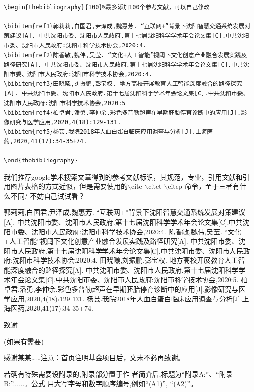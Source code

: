 \documentclass[a4paper, 10pt]{AvicReport}
\begin{document}
\begin{lstlisting}

\begin{thebibliography}{100}%最多添加100个参考文献，可以自己修改

\bibitem{ref1}郭莉莉,白国君,尹泽成,魏惠芳. “互联网+”背景下沈阳智慧交通系统发展对策建议[A]. 中共沈阳市委、沈阳市人民政府.第十七届沈阳科学学术年会论文集[C].中共沈阳市委、沈阳市人民政府:沈阳市科学技术协会,2020:4.
\bibitem{ref2}陈香敏,魏伟,吴莹. “文化+人工智能”视阈下文化创意产业融合发展实践及路径研究[A]. 中共沈阳市委、沈阳市人民政府.第十七届沈阳科学学术年会论文集[C].中共沈阳市委、沈阳市人民政府:沈阳市科学技术协会,2020:4.
\bibitem{ref3}田晓曦,刘振鹏,彭宝权. 地方高校开展教育人工智能深度融合的路径探究[A]. 中共沈阳市委、沈阳市人民政府.第十七届沈阳科学学术年会论文集[C].中共沈阳市委、沈阳市人民政府:沈阳市科学技术协会,2020:5.
\bibitem{ref4}柏卓君,潘勇,李仲余.彩色多普勒超声在早期胚胎停育诊断中的应用[J].影像研究与医学应用,2020,4(18):129-131.
\bibitem{ref5}杨芸.我院2018年人血白蛋白临床应用调查与分析[J].上海医药,2020,41(17):34-35+74.

\end{thebibliography}

\end{lstlisting}

我们推荐google学术搜索文章得到的参考文献标识，其规范，专业。引用文献和引用图片表格的方式近似，但是需要使用的$\backslash$cite $\backslash$citet $\backslash$citep 命令，至于三者有什么不同? 不妨自己试试看？




\begin{thebibliography}{100}

郭莉莉,白国君,尹泽成,魏惠芳. “互联网+”背景下沈阳智慧交通系统发展对策建议[A]. 中共沈阳市委、沈阳市人民政府.第十七届沈阳科学学术年会论文集[C].中共沈阳市委、沈阳市人民政府:沈阳市科学技术协会,2020:4.
陈香敏,魏伟,吴莹. “文化+人工智能”视阈下文化创意产业融合发展实践及路径研究[A]. 中共沈阳市委、沈阳市人民政府.第十七届沈阳科学学术年会论文集[C].中共沈阳市委、沈阳市人民政府:沈阳市科学技术协会,2020:4.
田晓曦,刘振鹏,彭宝权. 地方高校开展教育人工智能深度融合的路径探究[A]. 中共沈阳市委、沈阳市人民政府.第十七届沈阳科学学术年会论文集[C].中共沈阳市委、沈阳市人民政府:沈阳市科学技术协会,2020:5.
柏卓君,潘勇,李仲余.彩色多普勒超声在早期胚胎停育诊断中的应用[J].影像研究与医学应用,2020,4(18):129-131.
杨芸.我院2018年人血白蛋白临床应用调查与分析[J].上海医药,2020,41(17):34-35+74.

\end{thebibliography}



\newpage
\vspace{1em}
{\hei\wuhao 致谢\quad}
{\fang\wuhao 
(如果有需要)

感谢某某……注意：首页注明基金项目后，文末不必再致谢。
}


\vskip 20pt
 
 
若确有特殊需要设附录的,附录部分置于作
者简介后,标题为“附录A:”、“附录B:”......。公式
用大写字母和数字顺序编号,例如“(A1)”, “(A2)”。
\end{document}
